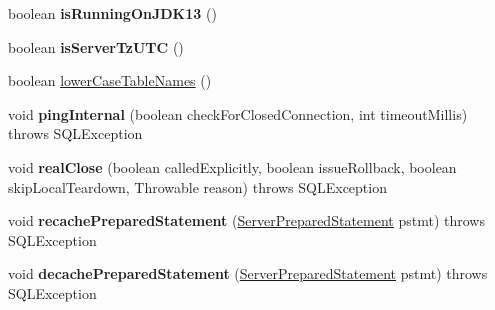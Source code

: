 \begin{DoxyCompactItemize}
\item 
\mbox{\label{interfacecom_1_1mysql_1_1jdbc_1_1_my_s_q_l_connection_a3c8ac106705f65c3b6fffed276fc9043}} 
boolean {\bfseries is\+Running\+On\+J\+D\+K13} ()
\item 
\mbox{\label{interfacecom_1_1mysql_1_1jdbc_1_1_my_s_q_l_connection_aa80dbf30aedd405147e7ffc34e883d8f}} 
boolean {\bfseries is\+Server\+Tz\+U\+TC} ()
\item 
boolean \mbox{\hyperlink{interfacecom_1_1mysql_1_1jdbc_1_1_my_s_q_l_connection_a5b25c6fb6c56e77ebc6989179da0dd75}{lower\+Case\+Table\+Names}} ()
\item 
\mbox{\label{interfacecom_1_1mysql_1_1jdbc_1_1_my_s_q_l_connection_ab98665162eb6e8893b4d8ed9faef81c8}} 
void {\bfseries ping\+Internal} (boolean check\+For\+Closed\+Connection, int timeout\+Millis)  throws S\+Q\+L\+Exception
\item 
\mbox{\label{interfacecom_1_1mysql_1_1jdbc_1_1_my_s_q_l_connection_acbfd453c5531e31e13ede95e395d7062}} 
void {\bfseries real\+Close} (boolean called\+Explicitly, boolean issue\+Rollback, boolean skip\+Local\+Teardown, Throwable reason)  throws S\+Q\+L\+Exception
\item 
\mbox{\label{interfacecom_1_1mysql_1_1jdbc_1_1_my_s_q_l_connection_acc1068a19fcd08ca2bf4823cf59adc5f}} 
void {\bfseries recache\+Prepared\+Statement} (\mbox{\hyperlink{classcom_1_1mysql_1_1jdbc_1_1_server_prepared_statement}{Server\+Prepared\+Statement}} pstmt)  throws S\+Q\+L\+Exception
\item 
\mbox{\label{interfacecom_1_1mysql_1_1jdbc_1_1_my_s_q_l_connection_ae15675da17fccd900086604be44863d0}} 
void {\bfseries decache\+Prepared\+Statement} (\mbox{\hyperlink{classcom_1_1mysql_1_1jdbc_1_1_server_prepared_statement}{Server\+Prepared\+Statement}} pstmt)  throws S\+Q\+L\+Exception
\item 
\mbox{\label{interfacecom_1_1mysql_1_1jdbc_1_1_my_s_q_l_connection_a41401e918f8eb9bec184ee32a324a719}} 

\end{DoxyCompactItemize}
